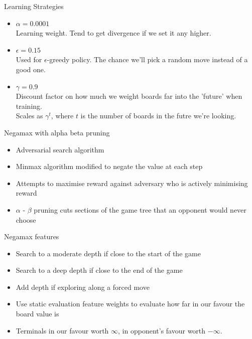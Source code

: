 \documentclass{beamer}
\begin{document}
\begin{frame}{Learning Strategies}
\begin{itemize}
	\item $\alpha = 0.0001$
		\\ Learning weight. Tend to get divergence if we set it any higher.
	
	\item $\epsilon = 0.15$
		\\ Used for $\epsilon$-greedy policy. The chance we'll pick a random move instead of a good one.
	\item $\gamma = 0.9$
		\\ Discount factor on how much we weight boards far into the 'future' when training.
		\\ Scales as $\gamma^t$, where $t$ is the number of boards in the futre we're looking.
	\end{itemize}
\end{frame}

\begin{frame}{Negamax with alpha beta pruning}
    \begin{itemize}
  \item
    Adversarial search algorithm
  \item
    Minmax algorithm modified to negate the value at each step
  \item
    Attempts to maximise reward against adversary who is actively minimising reward
  \item
   $\alpha$ - $\beta$ pruning cuts sections of the game tree that an opponent would never choose
  \end{itemize}
\end{frame}

\begin{frame}{Negamax features}
    \begin{itemize}
  \item
    Search to a moderate depth if close to the start of the game
  \item
    Search to a deep depth if close to the end of the game
  \item
    Add depth if exploring along a forced move
  \item
    Use static evaluation feature weights to evaluate how far in our favour the board value is
  \item
    Terminals in our favour worth $\infty$, in opponent's favour worth $-\infty$.
  \end{itemize}
\end{frame}
\end{document}

